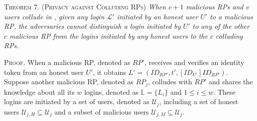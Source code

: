 

\vspace{3mm}
\noindent \textsc{Theorem 7. (Privacy against Colluding RPs)} {\em When $c+1$ malicious RPs and $v$ users collude in \usso, given any login $\mathcal{L'}$ initiated by an honest user $U'$ to a malicious RP, the adversaries cannot distinguish a login initiated by $U'$ to any of the other $c$ malicious RP from the logins initiated by any honest users to the $c$ colluding RPs.}




\vspace{0.75mm}
\noindent\textsc{Proof.}
When a malicious RP, denoted as $RP'$, receives and verifies an identity token from an honest user $U'$,
 it obtains $L' = (ID_{RP'}, t', [ID_{U'}]ID_{RP'})$. Suppose another malicious RP, denoted as $RP_j$, colludes with $RP'$ and shares the knowledge about all its $w$ logins, denoted as $\mathbb{L} = \{{L_{i}}\}$ and $1 \leq i \leq w$. These logins are initiated by a set of users, denoted as $\mathcal{U}_j$, including a set of honest users $\mathcal{U}_{j,H} \subseteq \mathcal{U}_{j}$ and
 a subset of malicious users $\mathcal{U}_{j,M} \subseteq \mathcal{U}_j$.

